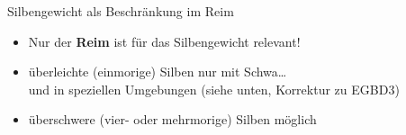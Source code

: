 \begin{frame}
  {Silbengewicht als Beschränkung im Reim}
  \pause
  \Halbzeile
  \begin{center}
  \end{center}
  \pause
  \Zeile
  \raggedright
  \begin{itemize}[<+->]
    \item \alert{Nur der \textbf{Reim} ist für das Silbengewicht relevant!}
    \item überleichte (einmorige) Silben nur mit Schwa\ldots\\
      und in speziellen Umgebungen (siehe unten, Korrektur zu EGBD3) \\
    \item überschwere (vier- oder mehrmorige) Silben  möglich
  \end{itemize}
\end{frame}


